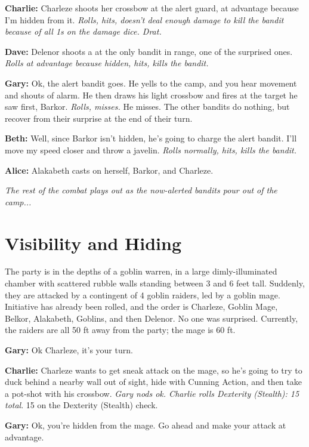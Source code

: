 \textbf{Charlie:} Charleze shoots her crossbow at the alert guard, at advantage because I'm hidden from it. \textit{Rolls, hits, doesn't deal enough damage to kill the bandit because of all 1s on the damage dice. Drat.}

\textbf{Dave:} Delenor shoots a  at the only bandit in range, one of the surprised ones. \textit{Rolls at advantage because hidden, hits, kills the bandit.}

\textbf{Gary:} Ok, the alert bandit goes. He yells to the camp, and you hear movement and shouts of alarm. He then draws his light crossbow and fires at the target he saw first, Barkor. \textit{Rolls, misses.} He misses. The other bandits do nothing, but recover from their surprise at the end of their turn.

\textbf{Beth:} Well, since Barkor isn't hidden, he's going to charge the alert bandit. I'll move my speed closer and throw a javelin. \textit{Rolls normally, hits, kills the bandit.}

\textbf{Alice:} Alakabeth casts  on herself, Barkor, and Charleze.

\textit{The rest of the combat plays out as the now-alerted bandits pour out of the camp...}

\section{Visibility and Hiding}\label{example:visibility-and-hiding}
The party is in the depths of a goblin warren, in a large dimly-illuminated chamber with scattered rubble walls standing between 3 and 6 feet tall. Suddenly, they are attacked by a contingent of 4 goblin raiders, led by a goblin mage. Initiative has already been rolled, and the order is Charleze, Goblin Mage, Belkor, Alakabeth, Goblins, and then Delenor. No one was surprised. Currently, the raiders are all 50 ft away from the party; the mage is 60 ft.

\textbf{Gary:} Ok Charleze, it's your turn.

\textbf{Charlie:} Charleze wants to get sneak attack on the mage, so he's going to try to duck behind a nearby wall out of sight, hide with Cunning Action, and then take a pot-shot with his crossbow. \textit{Gary nods ok. Charlie rolls Dexterity (Stealth): 15 total}. 15 on the Dexterity (Stealth) check.

\textbf{Gary:} Ok, you're hidden from the mage. Go ahead and make your attack at advantage.

